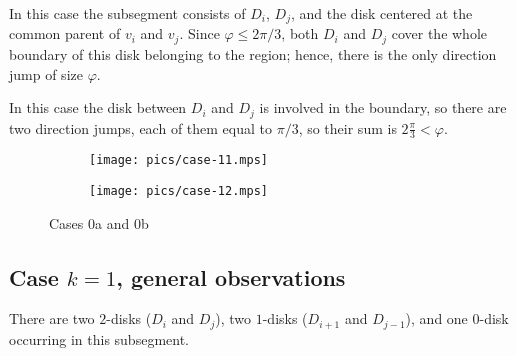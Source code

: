 \begin{enumerate}[label={\bf Case \arabic*: }, wide, labelwidth=!, labelindent=0pt]

In this case the subsegment consists of $D_i$, $D_j$, and the disk centered at the common parent of $v_i$ and $v_j$. Since $\varphi\leq 2\pi/3$, both $D_i$ and $D_j$ cover the whole boundary of this disk belonging to the region; hence, there is the only direction jump of size $\varphi$.



In this case the disk between $D_i$ and $D_j$ is involved in the boundary, so there are two direction jumps, each of them equal to $\pi/3$, so their sum is $2\frac{\pi}{3} < \varphi$.

\begin{figure}[h!]
    \centering
    \begin{subfigure}{.4\textwidth}
    \texttt{[image: pics/case-11.mps]}
    \end{subfigure}
    \begin{subfigure}{.5\textwidth}
    \texttt{[image: pics/case-12.mps]}
    \end{subfigure}
    \caption{Cases 0a and 0b}
\end{figure}

\subsection{Case $k = 1$, general observations}


There are two $2$-disks ($D_i$ and $D_j$), two $1$-disks ($D_{i+1}$ and $D_{j-1}$), and one $0$-disk occurring in this subsegment.


\end{enumerate}
